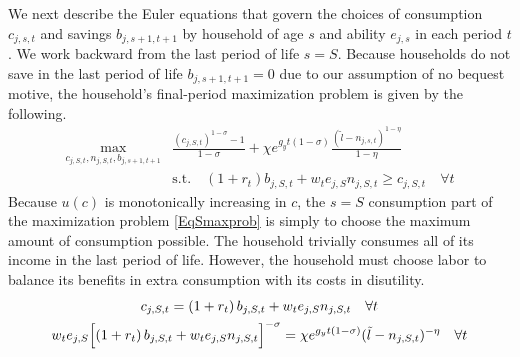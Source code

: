 \documentclass[letterpaper,12pt]{article}
\theoremstyle{definition}
\begin{document}
\begin{spacing}{1.5}
    We next describe the Euler equations that govern the choices of consumption $c_{j,s,t}$ and savings $b_{j,s+1,t+1}$ by household of age $s$ and ability $e_{j,s}$ in each period $t$. We work backward from the last period of life $s = S$. Because households do not save in the last period of life $b_{j,s+1,t+1}=0$ due to our assumption of no bequest motive, the household's final-period maximization problem is given by the following.
    \begin{equation}\label{EqSmaxprob}
      \begin{split}
        \max_{c_{j,S,t},n_{j,S,t},b_{j,s+1,t+1}} &\frac{\left(c_{j,S,t}\right)^{1-\sigma} - 1}{1 - \sigma} + \chi e^{g_y t(1-\sigma)}\frac{(\tilde{l}-n_{j,s,t})^{1-\eta}}{1-\eta} \\
        &\text{s.t.} \quad \left(1+r_t\right)b_{j,S,t} + w_t e_{j,S}n_{j,S,t} \geq c_{j,S,t} \quad \forall t
      \end{split}
    \end{equation}
    Because $u(c)$ is monotonically increasing in $c$, the $s=S$ consumption part of the maximization problem \eqref{EqSmaxprob} is simply to choose the maximum amount of consumption possible. The household trivially consumes all of its income in the last period of life. However, the household must choose labor to balance its benefits in extra consumption with its costs in disutility.
    \begin{gather}
      c_{j,S,t} = \left(1+r_t\right)b_{j,S,t} + w_t e_{j,S}n_{j,S,t} \quad \forall t \label{EqScons} \\
      w_t e_{j,S}\Bigl[\left(1+r_t\right)b_{j,S,t} + w_t e_{j,S}n_{j,S,t}\Bigr]^{-\sigma} = \chi e^{g_y t(1-\sigma)}(\tilde{l} - n_{j,S,t})^{-\eta} \quad\forall t \label{EqEulerSlab}
    \end{gather}


\end{spacing}
\end{document}
